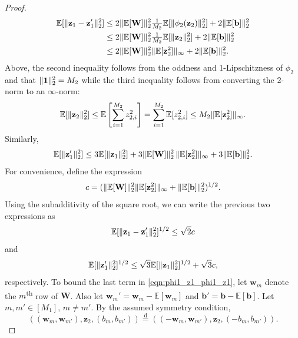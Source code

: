 \documentclass[twoside]{article}
\newcommand{\vb}{\mathbf{b}}
\newcommand{\vw}{\mathbf{w}}
\newcommand{\vz}{\mathbf{z}}
\newcommand{\vone}{\mathbf{1}}
\newcommand{\mW}{\mathbf{W}}
\newcommand{\E}{\mathbb{E}}
\newcommand{\disteq}{\overset{\text{d}}{=}}
\DeclarePairedDelimiter\norm{\|}{\|}             %
\theoremstyle{theoremstyle}
\begin{document}
\begin{proof}
    \begin{align}
        \E[\norm{\vz_1 - \vz'_1}^2_2]
        &\le 2\norm{\E[\mW]}_2^2 \tfrac1{M_2} \E[\norm{\phi_2(\vz_{2})}^2_2] + 2\norm{\E[\vb]}_2^2 \\
        &\le 2\norm{\E[\mW]}_2^2 \tfrac1{M_2} \E[\norm{\vz_{2}}^2_2] + 2\norm{\E[\vb]}_2^2 \label{eqn:use_lipschitz} \\
        &\le 2\norm{\E[\mW]}_2^2 \norm{\E[\vz_2^2]}_\infty + 2\norm{\E[\vb]}_2^2.
    \end{align}
    Above, the second inequality follows from the oddness and 1-Lipschitzness of $\phi_2$ and that $\norm{\vone}_2^2 = M_2$
    while the third inequality follows from converting the 2-norm to an $\infty$-norm:
    \begin{equation}
    \E[\norm{\vz_2}_2^2] \le \E\left[\sum_{i=1}^{M_2} z_{2,i}^2\right] = \sum_{i=1}^{M_2} \E[z_{2,i}^2] \le M_2 \norm{\E[\vz_2^2]}_\infty. \label{eqn:convert_2_infty}
    \end{equation}
    Similarly, 
    \begin{equation}
        \E[\norm{\vz'_1}^2_2]
        \le 3\E[\norm{\vz_1}^2_2] + 3\norm{\E[\mW]}_2^2\, \norm{\E[\vz_{2}^2]}_\infty + 3\norm{\E[\vb]}_2^2.
    \end{equation}
    For convenience, define the expression
    \begin{equation}
    c = (\norm{\E[\mW]}_2^2 \norm{\E[\vz_{2}^2]}_\infty + \norm{\E[\vb]}_2^2)^{1/2}.
    \end{equation}
    Using the subadditivity of the square root, we can write the previous two expressions as
    \begin{equation}
        \E[\norm{\vz_1 - \vz'_1}^2_2]^{1/2} \le \sqrt{2}c \label{eqn:z1_minutes_z1'}
    \end{equation}
    and
    \begin{equation}
        \E[\norm{\vz'_1}^2_2]^{1/2} \le \sqrt{3}\E[\norm{\vz_1}^2_2]^{1/2} + \sqrt{3}c, \label{eqn:z1-2}
    \end{equation}
    respectively. To bound the last term in \cref{eqn:phi1_z1_phi1_z1}, 
    let $\vw_m$ denote the $m$\textsuperscript{th} row of $\mW$.
    Also let $\vw_m' = \vw_m - \E[\vw_m]$ and $\vb' = \vb - \E[\vb]$.
    Let $m, m' \in [M_1]$, $m \neq m'$.
    By the assumed symmetry condition,
    \begin{equation}
        ((\vw_m, \vw_{m'}), \vz_2, (b_m, b_{m'}))
        \disteq
        ((-\vw_m, \vw_{m'}), \vz_2, (-b_m, b_{m'})).
    \end{equation}

\end{proof}
\end{document}
